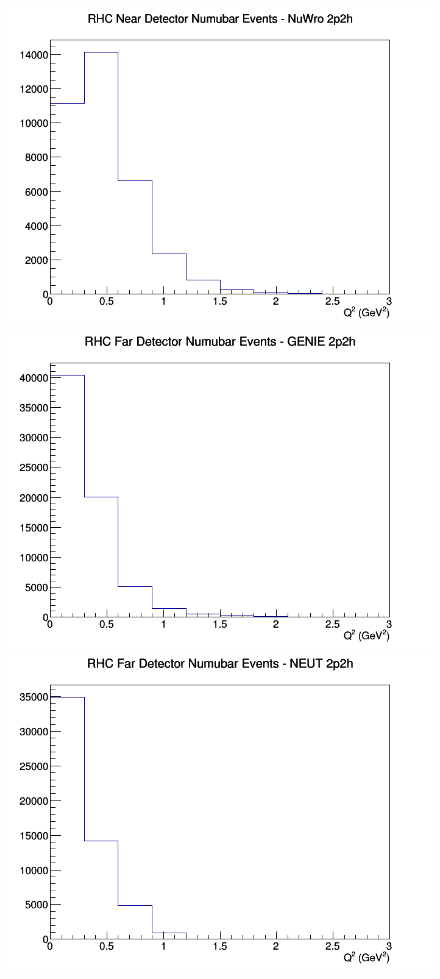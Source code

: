 \documentclass[12pt]{article}
\begin{document}
\begin{figure}[h]
\includegraphics[width=\linewidth]{Q2/nominal/2p2h_RHC_ND_numubar_Q2_NuWro.png}
\endminipage
\newline
{}
\includegraphics[width=\linewidth]{Q2/nominal/2p2h_RHC_FD_numubar_Q2_GENIE.png}
\endminipage
{}
\includegraphics[width=\linewidth]{Q2/nominal/2p2h_RHC_FD_numubar_Q2_NEUT.png}

\end{figure}
\end{document}
